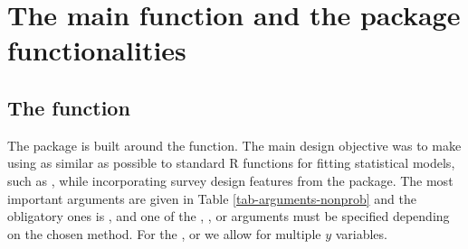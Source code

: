 \documentclass[
]{jss}
\begin{document}
\section{The main function and the package
functionalities}\label{sec-package}

\subsection[The nonprob function]{The  function}

The  package is built around the 
function. The main design objective was to make using  as
similar as possible to standard R functions for fitting statistical
models, such as , while incorporating survey design
features from the  package. The most important arguments are
given in Table \ref{tab-arguments-nonprob} and the obligatory ones is
, and one of the , , or
 arguments must be specified depending on the chosen
method. For the , or  we allow for multiple
\(y\) variables.
\end{document}

